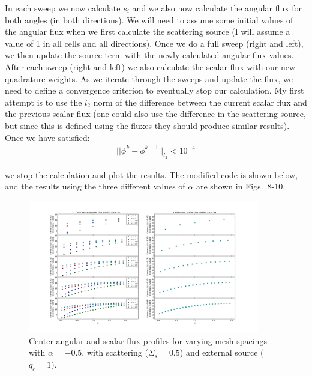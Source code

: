 \documentclass[10pt]{article}
\begin{document}
In each sweep we now calculate $s_i$ and we also now calculate the angular flux for both angles (in both directions). We will need to assume some initial values of the angular flux when we first calculate the scattering source (I will assume a value of 1 in all cells and all directions). Once we do a full sweep (right and left), we then update the source term with the newly calculated angular flux values. After each sweep (right and left) we also calculate the scalar flux with our new quadrature weights. As we iterate through the sweeps and update the flux, we need to define a convergence criterion to eventually stop our calculation. My first attempt is to use the $l_2$ norm of the difference between the current scalar flux and the previous scalar flux (one could also use the difference in the scattering source, but since this is defined using the fluxes they should produce similar results). Once we have satisfied:
%
\begin{align*}
    || \phi^k - \phi^{k-1} ||_{l_2} < 10^{-4}
\end{align*}

we stop the calculation and plot the results. The modified code is shown below, and the results using the three different values of $\alpha$ are shown in Figs.~8-10.



\begin{figure}[H]
    \centering
    \includegraphics[width=0.9\textwidth]{Figures/FluxProfile_a=-05_source}
    \caption{Center angular and scalar flux profiles for varying mesh spacings with $\alpha = -0.5$, with scattering ($\Sigma_s = 0.5$) and external source ($q_e=1$).}
    \label{fig8}
\end{figure}
\end{document}

